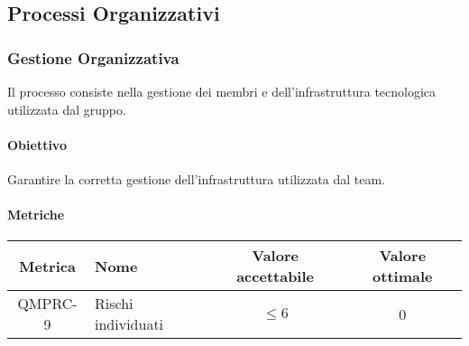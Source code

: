 \subsection{Processi Organizzativi}
\subsubsection{Gestione Organizzativa}
Il processo consiste nella gestione dei membri e dell'infrastruttura tecnologica
utilizzata dal gruppo.

\paragraph{Obiettivo}
Garantire la corretta gestione dell'infrastruttura utilizzata dal team.

\paragraph{Metriche}
\begin{center}
    \renewcommand{\arraystretch}{1.8}
    \begin{tabular}{ |c|m{12em}|c|c|}
        \hline
        \textbf{Metrica} & \textbf{Nome} & \textbf{Valore accettabile} & \textbf{Valore ottimale} \\
        \hline
        QMPRC-9 & Rischi individuati & $ \leq 6 $ & 0 \\
        \hline
    \end{tabular}
\end{center}